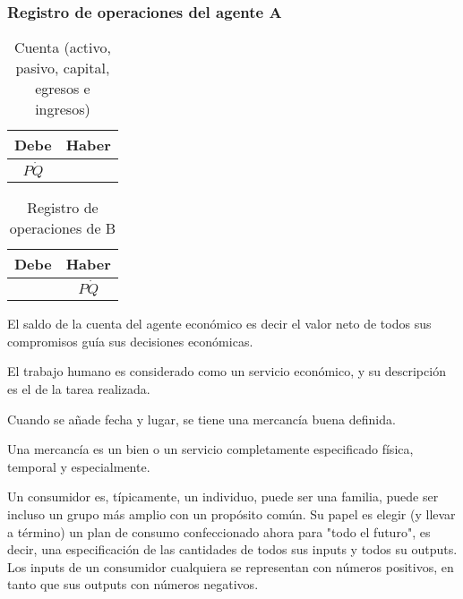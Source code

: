 \subsubsection{Registro de operaciones del agente A}
\begin{table}[h!]
    \centering
    \begin{tabular}{@{}cc@{}}
    \toprule
    Debe      & Haber \\ \midrule
    $P\dot Q$ &       \\ \bottomrule
    \end{tabular}
    \caption{Cuenta (activo, pasivo, capital, egresos e ingresos)}
    \label{tabe1}
\end{table}
\begin{table}[h!]
    \centering
    \begin{tabular}{@{}cc@{}}
    \toprule
    Debe      & Haber \\ \midrule
              & $P\dot Q$ \\ \bottomrule
    \end{tabular}
    \caption{Registro de operaciones de B}
    \label{tabe2}
\end{table}
El saldo de la cuenta del agente económico es decir el valor neto de todos sus compromisos guía sus decisiones económicas.




\begin{example}
    El trabajo humano es considerado como un servicio económico, y su descripción es el de la tarea realizada. 

    Cuando se añade fecha y lugar, se tiene una mercancía buena definida.
\end{example}
Una mercancía es un bien o un servicio completamente especificado física, temporal y especialmente.

Un consumidor es, típicamente, un individuo, puede ser una familia, puede ser incluso un grupo más amplio con un propósito común. Su papel es elegir (y llevar a término) un plan de consumo confeccionado ahora para "todo el futuro", es decir, una especificación de las cantidades de todos sus inputs y todos su outputs.
Los inputs de un consumidor cualquiera se representan con números positivos, en tanto que sus outputs con números negativos.

